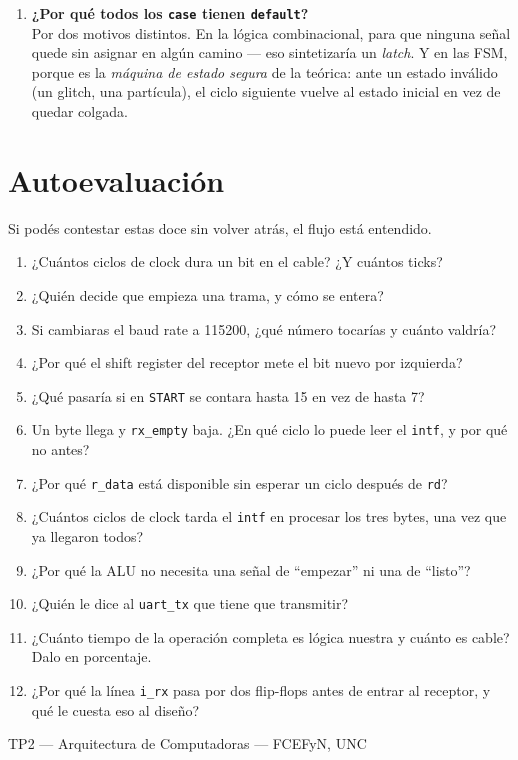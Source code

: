 \documentclass[11pt,a4paper]{article}
\newcommand{\sg}[1]{\texttt{\small #1}}
\begin{document}
\begin{enumerate}[leftmargin=1.6em, itemsep=7pt]
\item \textbf{¿Por qu\'e todos los \sg{case} tienen \sg{default}?}\\
Por dos motivos distintos. En la l\'ogica combinacional, para que ninguna se\~nal
quede sin asignar en alg\'un camino --- eso sintetizar\'ia un \emph{latch}. Y en
las FSM, porque es la \emph{m\'aquina de estado segura} de la te\'orica: ante un
estado inv\'alido (un glitch, una part\'icula), el ciclo siguiente vuelve al
estado inicial en vez de quedar colgada.

\end{enumerate}

\section{Autoevaluaci\'on}

Si pod\'es contestar estas doce sin volver atr\'as, el flujo est\'a entendido.

\begin{enumerate}[leftmargin=1.6em, itemsep=4pt]
\item ¿Cu\'antos ciclos de clock dura un bit en el cable? ¿Y cu\'antos ticks?
\item ¿Qui\'en decide que empieza una trama, y c\'omo se entera?
\item Si cambiaras el baud rate a 115200, ¿qu\'e n\'umero tocar\'ias y cu\'anto
      valdr\'ia?
\item ¿Por qu\'e el shift register del receptor mete el bit nuevo por izquierda?
\item ¿Qu\'e pasar\'ia si en \sg{START} se contara hasta 15 en vez de hasta 7?
\item Un byte llega y \sg{rx\_empty} baja. ¿En qu\'e ciclo lo puede leer el
      \sg{intf}, y por qu\'e no antes?
\item ¿Por qu\'e \sg{r\_data} est\'a disponible sin esperar un ciclo despu\'es de
      \sg{rd}?
\item ¿Cu\'antos ciclos de clock tarda el \sg{intf} en procesar los tres bytes,
      una vez que ya llegaron todos?
\item ¿Por qu\'e la ALU no necesita una se\~nal de ``empezar'' ni una de ``listo''?
\item ¿Qui\'en le dice al \sg{uart\_tx} que tiene que transmitir?
\item ¿Cu\'anto tiempo de la operaci\'on completa es l\'ogica nuestra y cu\'anto es
      cable? Dalo en porcentaje.
\item ¿Por qu\'e la l\'inea \sg{i\_rx} pasa por dos flip-flops antes de entrar al
      receptor, y qu\'e le cuesta eso al dise\~no?
\end{enumerate}

\vfill
\begin{center}
\sffamily\footnotesize\color{gris}
TP2 --- Arquitectura de Computadoras --- FCEFyN, UNC
\end{center}
\end{document}
